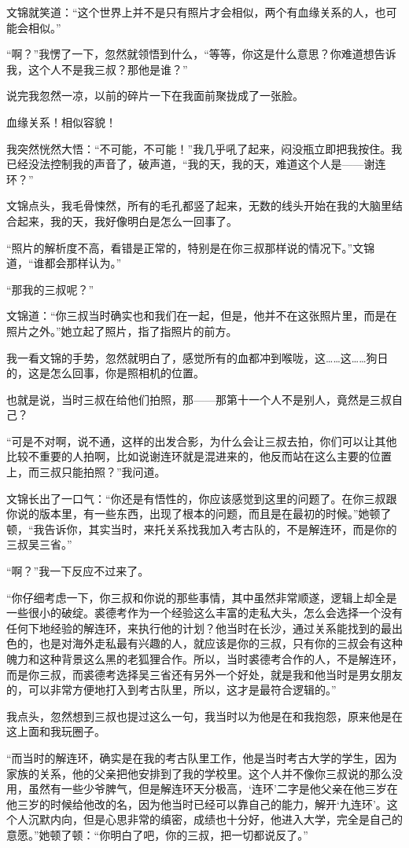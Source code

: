 文锦就笑道：“这个世界上并不是只有照片才会相似，两个有血缘关系的人，也可能会相似。”

“啊？”我愣了一下，忽然就领悟到什么，“等等，你这是什么意思？你难道想告诉我，这个人不是我三叔？那他是谁？”

说完我忽然一凉，以前的碎片一下在我面前聚拢成了一张脸。

血缘关系！相似容貌！

我突然恍然大悟：“不可能，不可能！”我几乎吼了起来，闷没瓶立即把我按住。我已经没法控制我的声音了，破声道，“我的天，我的天，难道这个人是——谢连环？”

文锦点头，我毛骨悚然，所有的毛孔都竖了起来，无数的线头开始在我的大脑里结合起来，我的天，我好像明白是怎么一回事了。

“照片的解析度不高，看错是正常的，特别是在你三叔那样说的情况下。”文锦道，“谁都会那样认为。”

“那我的三叔呢？”

文锦道：“你三叔当时确实也和我们在一起，但是，他并不在这张照片里，而是在照片之外。”她立起了照片，指了指照片的前方。

我一看文锦的手势，忽然就明白了，感觉所有的血都冲到喉咙，这……这……狗日的，这是怎么回事，你是照相机的位置。

也就是说，当时三叔在给他们拍照，那——那第十一个人不是别人，竟然是三叔自己？

“可是不对啊，说不通，这样的出发合影，为什么会让三叔去拍，你们可以让其他比较不重要的人拍啊，比如说谢连环就是混进来的，他反而站在这么主要的位置上，而三叔只能拍照？”我问道。

文锦长出了一口气：“你还是有悟性的，你应该感觉到这里的问题了。在你三叔跟你说的版本里，有一些东西，出现了根本的问题，而且是在最初的时候。”她顿了顿，“我告诉你，其实当时，来托关系找我加入考古队的，不是解连环，而是你的三叔吴三省。”

“啊？”我一下反应不过来了。

“你仔细考虑一下，你三叔和你说的那些事情，其中虽然非常顺遂，逻辑上却全是一些很小的破绽。裘德考作为一个经验这么丰富的走私大头，怎么会选择一个没有任何下地经验的解连环，来执行他的计划？他当时在长沙，通过关系能找到的最出色的，也是对海外走私最有兴趣的人，就应该是你的三叔，只有你的三叔会有这种魄力和这种背景这么黑的老狐狸合作。所以，当时裘德考合作的人，不是解连环，而是你三叔，而裘德考选择吴三省还有另外一个好处，就是我和他当时是男女朋友的，可以非常方便地打入到考古队里，所以，这才是最符合逻辑的。”

我点头，忽然想到三叔也提过这么一句，我当时以为他是在和我抱怨，原来他是在这上面和我玩圈子。

“而当时的解连环，确实是在我的考古队里工作，他是当时考古大学的学生，因为家族的关系，他的父亲把他安排到了我的学校里。这个人并不像你三叔说的那么没用，虽然有一些少爷脾气，但是解连环天分极高，‘连环’二字是他父亲在他三岁在他三岁的时候给他改的名，因为他当时已经可以靠自己的能力，解开‘九连环’。这个人沉默内向，但是心思非常的缜密，成绩也十分好，他进入大学，完全是自己的意愿。”她顿了顿：“你明白了吧，你的三叔，把一切都说反了。”

